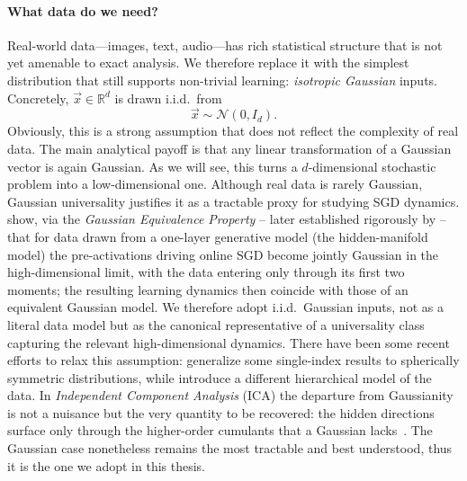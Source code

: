 \paragraph{What data do we need?}
Real-world data---images, text, audio---has rich statistical structure that is not
yet amenable to exact analysis.
We therefore replace it with the simplest distribution that still supports
non-trivial learning: \emph{isotropic Gaussian} inputs.
Concretely, $\vec{x} \in \mathbb{R}^d$ is drawn i.i.d.\ from
\[\vec{x} \sim \mathcal{N}(0, I_d).\]
Obviously, this is a strong assumption that does not reflect the complexity of real data.
The main analytical payoff is that any linear transformation of a Gaussian vector is
again Gaussian. As we will see, this turns a $d$-dimensional stochastic problem into a
low-dimensional one. Although real data is rarely Gaussian, Gaussian universality justifies it as a tractable proxy for studying SGD dynamics. \citet{goldt2020modeling} show, via the \emph{Gaussian Equivalence Property} -- later established rigorously by \citet{goldt2022gaussian} -- that for data drawn from a one-layer generative model (the hidden-manifold model) the pre-activations driving online SGD become jointly Gaussian in the high-dimensional limit, with the data entering only through its first two moments; the resulting learning dynamics then coincide with those of an equivalent Gaussian model. We therefore adopt i.i.d.\ Gaussian inputs, not as a literal data model but as the canonical representative of a universality class capturing the relevant high-dimensional dynamics.
There have been some recent efforts to relax this assumption: \citet{zweig2023single} generalize some single-index results to spherically symmetric distributions, while \citet{cagnetta2024how} introduce a different hierarchical model of the data.
In \emph{Independent Component Analysis} (ICA) the departure from Gaussianity is not a nuisance but the very quantity to be recovered: the hidden directions surface only through the higher-order cumulants that a Gaussian lacks~\citep{ricci2025feature}. The Gaussian case nonetheless remains the most tractable and best understood, thus it is the one we adopt in this thesis.


